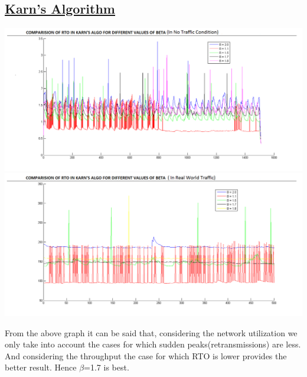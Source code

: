 \documentclass[12pt]{article}
\begin{document}
\subsection{\underline{Karn's Algorithm}}
\begin{center}
 \includegraphics[scale=0.5]{karn.png}
\includegraphics[scale=0.5]{karn1.png}
\end{center}
From the above graph it can be said that, considering the network utilization we only take into account the cases for which sudden peaks(retransmissions) are less. And considering the throughput the case for which RTO is lower provides the better result. Hence $\beta$=1.7 is best.
\end{document}
